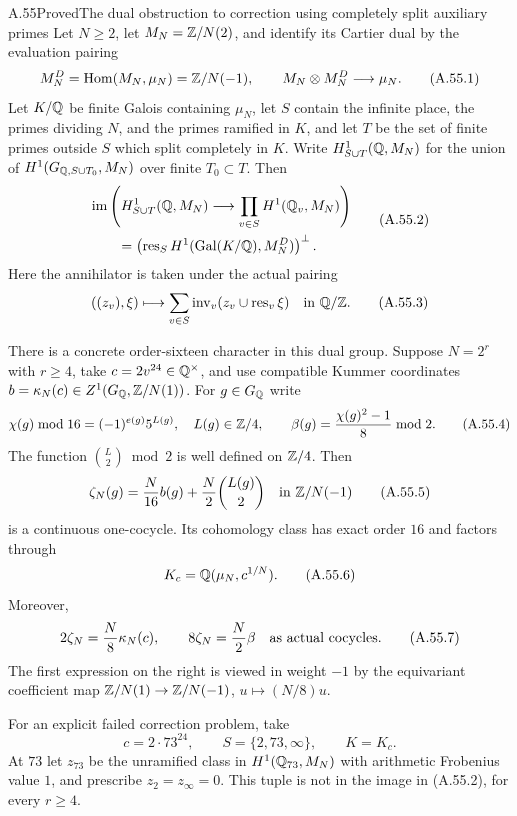 \begin{statement}{A.55}{Proved}{The dual obstruction to correction using completely split auxiliary primes}
Let $N\ge2$, let $M_N=\mathbb Z/N(2)$, and identify its Cartier dual by
the evaluation pairing
\[
 M_N^D=\operatorname{Hom}(M_N,\mu_N)=\mathbb Z/N(-1),\qquad
 M_N\otimes M_N^D\longrightarrow\mu_N.
 \tag{A.55.1}
\]
Let $K/\mathbb Q$ be finite Galois containing $\mu_N$, let $S$ contain
the infinite place, the primes dividing $N$, and the primes ramified
in $K$, and let $T$ be the set of finite primes outside $S$ which
split completely in $K$.  Write $H^1_{S\cup T}(\mathbb Q,M_N)$ for the
union of $H^1(G_{\mathbb Q,S\cup T_0},M_N)$ over finite $T_0\subset T$.
Then
\[
 \begin{aligned}
 &\operatorname{im}\left(H^1_{S\cup T}(\mathbb Q,M_N)
       \longrightarrow\prod_{v\in S}H^1(\mathbb Q_v,M_N)\right)
 \\
 &\qquad=\left(\operatorname{res}_S
     H^1(\operatorname{Gal}(K/\mathbb Q),M_N^D)\right)^\perp.
 \end{aligned}
 \tag{A.55.2}
\]
Here the annihilator is taken under the actual pairing
\[
 ((z_v),\xi)\longmapsto
       \sum_{v\in S}\operatorname{inv}_v
                        (z_v\cup\operatorname{res}_v\xi)
          \quad\hbox{in }\mathbb Q/\mathbb Z.
 \tag{A.55.3}
\]

There is a concrete order-sixteen character in this dual group.
Suppose $N=2^r$ with $r\ge4$, take $c=2v^{24}\in\mathbb Q^\times$,
and use compatible Kummer coordinates
$b=\kappa_N(c)\in Z^1(G_\mathbb Q,\mathbb Z/N(1))$.
For $g\in G_\mathbb Q$ write
\[
 \chi(g)\bmod16=(-1)^{e(g)}5^{L(g)},\quad L(g)\in\mathbb Z/4,
 \qquad
 \beta(g)=\frac{\chi(g)^2-1}{8}\bmod2.
 \tag{A.55.4}
\]
The function $\binom{L}{2}\bmod2$ is well defined on $\mathbb Z/4$.
Then
\[
 \zeta_N(g)=\frac N{16}b(g)+\frac N2\binom{L(g)}2
                  \quad\hbox{in }\mathbb Z/N(-1)
 \tag{A.55.5}
\]
is a continuous one-cocycle.  Its cohomology class has exact
order $16$ and factors through
\[
                     K_c=\mathbb Q(\mu_N,c^{1/N}).
 \tag{A.55.6}
\]
Moreover,
\[
          2\zeta_N=\frac N8\kappa_N(c),\qquad
          8\zeta_N=\frac N2\beta
                  \quad\hbox{as actual cocycles}.
 \tag{A.55.7}
\]
The first expression on the right is viewed in weight $-1$ by
the equivariant coefficient map $\mathbb Z/N(1)\to\mathbb Z/N(-1)$,
$u\mapsto(N/8)u$.

For an explicit failed correction problem, take
\[
              c=2\cdot73^{24},\qquad S=\{2,73,\infty\},
              \qquad K=K_c.
 \tag{A.55.8}
\]
At $73$ let $z_{73}$ be the unramified class in
$H^1(\mathbb Q_{73},M_N)$ with arithmetic Frobenius value $1$,
and prescribe $z_2=z_\infty=0$.  This tuple is not in the
image in (A.55.2), for every $r\ge4$.


\end{statement}
